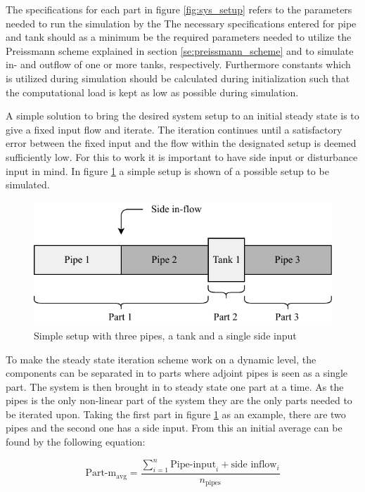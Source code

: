 The specifications for each part in figure \ref{fig:sys_setup} refers to the parameters needed to run the simulation by the 
The necessary specifications entered for pipe and tank should as a minimum be the required parameters needed to utilize the Preissmann scheme explained in section \ref{se:preissmann_scheme} and to simulate in- and outflow of one or more tanks, respectively. Furthermore constants which is utilized during simulation should be calculated during initialization such that the computational load is kept as low as possible during simulation. 

A simple solution to bring the desired system setup to an initial steady state is to give a fixed input flow and iterate. 
The iteration continues until a satisfactory error between the fixed input and the flow within the designated setup is deemed sufficiently low. For this to work it is important to have side input or disturbance input in mind. In figure \ref{fig:simple_sewer} a simple setup is shown of a possible setup to be simulated. 

\begin{figure}[H]
\centering
\includegraphics[width=0.55 \textwidth]{report/simulation/pictures/simple_sewer.pdf}
\caption{Simple setup with three pipes, a tank and a single side input}
\label{fig:simple_sewer}
\end{figure}

To make the steady state iteration scheme work on a dynamic level, the components can be separated in to parts where adjoint pipes is seen as a single part. The system is then brought in to steady state one part at a time. As the pipes is the only non-linear part of the system they are the only parts needed to be iterated upon. Taking the first part in figure \ref{fig:simple_sewer} as an example, there are two pipes and the second one has a side input.
From this an initial average can be found by the following equation:

\begin{equation}
 \text{Part-m}_{\text{avg}}	=  \frac{ \sum\limits_{i=1}^n \text{Pipe-input}_i + \text{side inflow}_i }{ n_{\text{pipes}} } 
 \end{equation} \label{avg_init_flow}

